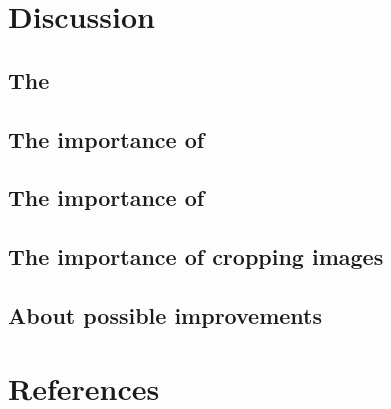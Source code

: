 \documentclass[twocolumn,superscriptaddress,aps]{revtex4-1}
\begin{document}






\section{Discussion} %

\subsection{The}

\subsection{The importance of }


\subsection{The importance of }


\subsection{The importance of cropping images}

\subsection{About possible improvements}

\newpage
\section{References}



\end{document}
